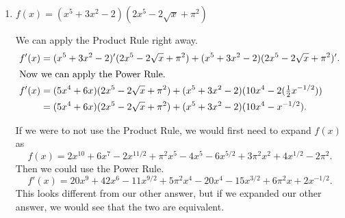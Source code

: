 \documentclass{article}
\begin{document}
\begin{enumerate}
\begin{enumerate}
\begin{enumerate}
\begin{solution}
        To simplify, we can factor
        out $\frac{3}{2}x^{-5/2}$ to get 
        $\tfrac{3}{2}x^{-5/2}(7x^5 + \sqrt{7})=\dfrac{3(7x^2+\sqrt{7})}{2x^{5/2}}$.

        If we were to use the Product Rule, we might first rewrite $f(x)$ as 
        $(3x^5-\sqrt{7})(x^{-3/2})$. Then, we'd have
        \begin{align*}
          f'(x) &= (3x^5-\sqrt{7})'(x^{-3/2}) + (3x^5-\sqrt{7})(x^{-3/2})' \\
          &= (15x^4)(x^{-3/2}) + (3x^5-\sqrt{7})(-\tfrac{3}{2}x^{-5/2}).
        \end{align*}
        This looks different from our other answer, but if we factor out 
        $-\frac{3}{2}x^{-5/2}$ and combine like terms, we can see that they are equivalent.
      \end{solution}

    \item
      \begin{problem}[\nstretch{2}]
        $f(x) = (x^5 + 3x^2 -2) (2x^5 - 2\sqrt x + \pi^2)$
      \end{problem}

      \begin{solution}
        We can apply the Product Rule right away.
        \begin{align*}
          f'(x) &= (x^5 + 3x^2 -2)'(2x^5 - 2\sqrt x + \pi^2)
          + (x^5 + 3x^2 -2)(2x^5 - 2\sqrt x + \pi^2)'. \\
          \intertext{Now we can apply the Power Rule.}
          f'(x) &= (5x^4 + 6x)(2x^5 - 2\sqrt x + \pi^2) 
          + (x^5 + 3x^2 -2)(10x^4 - 2(\tfrac{1}{2}x^{-1/2})) \\
          &= (5x^4 + 6x)(2x^5 - 2\sqrt x + \pi^2) 
          + (x^5 + 3x^2 -2)(10x^4 - x^{-1/2}).
        \end{align*}

        If we were to not use the Product Rule, we would first need to expand $f(x)$ as
        \[f(x) = 2x^{10} + 6x^7 -2x^{11/2} + \pi^2 x^5 - 4x^5 -6x^{5/2} + 3\pi^2x^2 
        + 4 x^{1/2} -2\pi^2.\]
        Then we could use the Power Rule.
        \[f'(x) = 20x^{9} + 42x^6 -11x^{9/2} + 5\pi^2 x^4 - 20x^4 -15x^{3/2} + 6\pi^2x 
        + 2 x^{-1/2}.\]
        This looks different from our other answer, but if we expanded our other answer,
        we would see that the two are equivalent.
      \end{solution}

    \end{enumerate}


\end{enumerate}
\end{enumerate}
\end{document}
